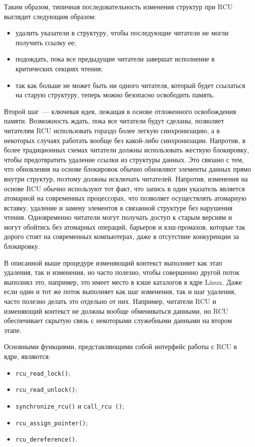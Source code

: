 Таким образом, типичная последовательность изменения структур при RCU выглядит
следующим образом:
\begin{itemize}
\item удалить указатели в структуру, чтобы последующие читатели не могли
  получить ссылку ее;
\item подождать, пока все предыдущие читатели завершат исполнение в критических
  секциях чтения;
\item так как больше не может быть ни одного читателя, который будет ссылаться
  на старую структуру, теперь можно безопасно освободить память.
\end{itemize}

Второй шаг~--- ключевая идея, лежащая в основе отложенного освобождения памяти.
Возможность ждать, пока все читатели будут сделаны, позволяет читателям RCU
использовать гораздо более легкую синхронизацию, а в некоторых случаях работать
вообще без какой-либо синхронизации. Напротив, в более традиционных схемах
читатели должны использовать жесткую блокировку, чтобы предотвратить удаление
ссылки из структуры данных. Это связано с тем, что обновления на основе
блокировок обычно обновляют элементы данных прямо внутри структур, поэтому
должны исключать читателей. Напротив, изменения на основе RCU обычно используют
тот факт, что запись в один указатель является атомарной на современных
процессорах, что позволяет осуществлять атомарную вставку, удаление и замену
элементов в связанной структуре без нарушения чтения. Одновременно читатели
могут получать доступ к старым версиям и могут обойтись без атомарных операций,
барьеров и кэш-промахов, которые так дорого стоят на современных компьютерах,
даже в отсутствие конкуренции за блокировку.

В описанной выше процедуре изменяющий контекст выполняет как этап
удаления, так и изменения, но часто полезно, чтобы совершенно другой поток
выполнял это, например, это имеет место в кэше каталогов в ядре Linux. Даже если
один и тот же поток выполняет как шаг изменения, так и шаг удаления, часто
полезно делать это отдельно от них. Например, читатели RCU и изменяющий контекст
не должны вообще обмениваться данными, но RCU обеспечивает скрытую связь с
некоторыми служебными данными на втором этапе.

Основными функциями, представляющими собой интерфейс работы с RCU в ядре,
являются:
\begin{itemize}
\item \texttt{rcu\_read\_lock()};
\item \texttt{rcu\_read\_unlock()};
\item \texttt{synchronize\_rcu()} и \texttt{call\_rcu ()};
\item \texttt{rcu\_assign\_pointer()};
\item \texttt{rcu\_dereference()}.
\end{itemize}

